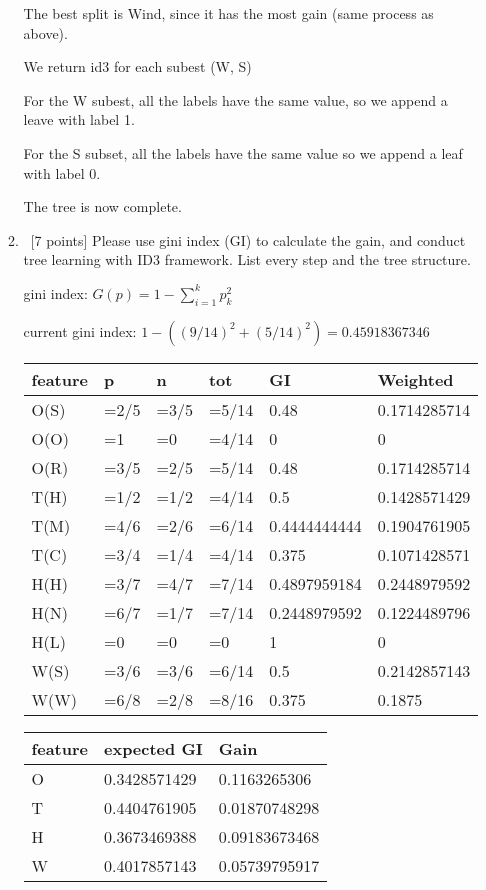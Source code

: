 \documentclass[12pt, fullpage,letterpaper]{article}
\begin{document}
\begin{enumerate}
\begin{enumerate}
		
		The best split is Wind, since it has the most gain (same process as above).
		
		We return id3 for each subest (W, S)
		
		For the W subest, all the labels have the same value, so we append a leave with label 1.
		
		For the S subset, all the labels have the same value so we append a leaf with label 0.
		
		The tree is now complete.
	\item~[7 points] Please use gini index (GI) to calculate the gain, and conduct tree learning with ID3 framework. List every step and the tree structure.
	

	gini index: $G(p)=1-\sum^k_{i=1}p_k^2$

	current gini index: $1-((9/14)^2 + (5/14)^2)=0.45918367346	$

	\begin{tabular}{|l|l|l|l|l|l|}
		\hline
		feature & p    & n    & tot   & GI      & Weighted     \\ \hline
		O(S)    & =2/5 & =3/5 & =5/14 & 0.48         & 0.1714285714 \\ \hline
		O(O)    & =1   & =0   & =4/14 & 0            & 0            \\ \hline
		O(R)    & =3/5 & =2/5 & =5/14 & 0.48         & 0.1714285714 \\ \hline
		T(H)    & =1/2 & =1/2 & =4/14 & 0.5          & 0.1428571429 \\ \hline
		T(M)    & =4/6 & =2/6 & =6/14 & 0.4444444444 & 0.1904761905 \\ \hline
		T(C)    & =3/4 & =1/4 & =4/14 & 0.375        & 0.1071428571 \\ \hline
		H(H)    & =3/7 & =4/7 & =7/14 & 0.4897959184 & 0.2448979592 \\ \hline
		H(N)    & =6/7 & =1/7 & =7/14 & 0.2448979592 & 0.1224489796 \\ \hline
		H(L)    & =0   & =0   & =0    & 1            & 0            \\ \hline
		W(S)    & =3/6 & =3/6 & =6/14 & 0.5          & 0.2142857143 \\ \hline
		W(W)    & =6/8 & =2/8 & =8/16 & 0.375        & 0.1875       \\ \hline
		\end{tabular}
	
		\begin{tabular}{|l|l|l|}
			\hline
			feature & expected GI  & Gain          \\ \hline
			O       & 0.3428571429 & 0.1163265306  \\ \hline
			T       & 0.4404761905 & 0.01870748298 \\ \hline
			H       & 0.3673469388 & 0.09183673468 \\ \hline
			W       & 0.4017857143 & 0.05739795917 \\ \hline
			\end{tabular}


\end{enumerate}
\end{enumerate}
\end{document}
